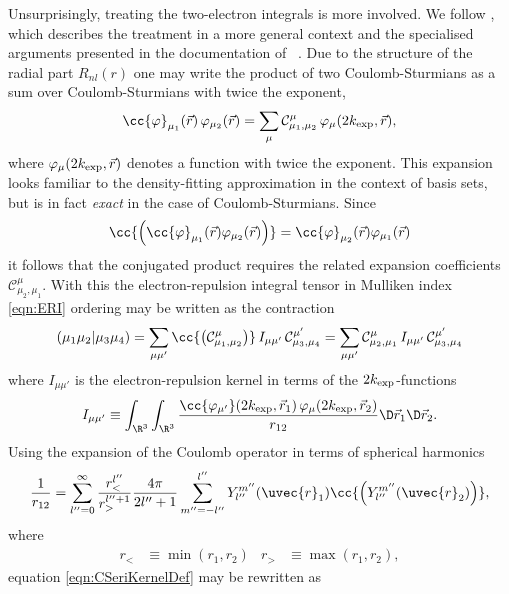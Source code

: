Unsurprisingly, treating the two-electron integrals is more involved.
We follow \cite{Avery2015},
which describes the treatment in a more general context
and the specialised arguments presented in the documentation of
\sturmint~\cite{sturmintWeb}.
Due to the structure of the radial part $R_{nl}(r)$
one may write the product of two Coulomb-Sturmians as a
sum over Coulomb-Sturmians with twice the exponent, \ie
\newcommand{\csC}{\mathcal{C}}
\begin{equation}
	\cc{\varphi}_{\mu_1}(\vec{r}) \, \varphi_{\mu_2}(\vec{r})
	= \sum_{\mu} \csC^\mu_{\mu_1,\mu_2} \, \varphi_{\mu}(2\kexp, \vec{r}),
	\label{eqn:CSshellpairExpansion}
\end{equation}
where $\varphi_{\mu}(2k_\text{exp}, \vec{r})$ denotes a \CS function
with twice the exponent.
This expansion looks familiar to the density-fitting approximation
in the context of \cGTO basis sets,
but is in fact \emph{exact} in the case of Coulomb-Sturmians.
Since
\[ \cc{\left( \cc{\varphi}_{\mu_1}(\vec{r}) \varphi_{\mu_2}(\vec{r}) \right)} =
\cc{\varphi}_{\mu_2}(\vec{r}) \varphi_{\mu_1}(\vec{r}) \]
it follows that the conjugated product requires the related
expansion coefficients $\csC^\mu_{\mu_2,\mu_1}$.
With this the electron-repulsion integral tensor in Mulliken index \eqref{eqn:ERI}
ordering may be written as the contraction
\begin{equation}
	\eriMu{\mu_1\mu_2}{\mu_3\mu_4}
		= \sum_{\mu\mu'} \cc{\left(\csC^\mu_{\mu_1,\mu_2}\right)} \,
		I_{\mu\mu'} \, \csC^{\mu'}_{\mu_3,\mu_4}
		= \sum_{\mu\mu'} \csC^\mu_{\mu_2,\mu_1} \,
		I_{\mu\mu'} \, \csC^{\mu'}_{\mu_3,\mu_4}
	\label{eqn:CSeriContraction}
\end{equation}
where $I_{\mu\mu'}$ is the electron-repulsion kernel in terms of the $2k_\text{exp}$-functions
\begin{equation}
	I_{\mu\mu'} \equiv
	\int_{\R^3} \int_{\R^3}
	\frac{
	\cc{\varphi_{\mu'}}(2\kexp,\vec{r}_1) \,
	\varphi_{\mu}(2\kexp,\vec{r}_2)
	}{r_{12}}
	\D\vec{r}_1 \D\vec{r}_2.
	\label{eqn:CSeriKernelDef}
\end{equation}
Using the expansion of the Coulomb operator
in terms of spherical harmonics~\cite{Avery2018}
\[ \frac{1}{r_{12}} = \sum_{l''=0}^\infty
	\frac{r^{l''}_<}{r_>^{l'' + 1}} \frac{4\pi}{2l'' + 1}
	\sum_{m''=-{l''}}^{l''} Y_{l''}^{m''}(\uvec{r}_1)
	\cc{\left(Y_{l''}^{m''}(\uvec{r}_2)\right)},
\]
where
\begin{align*}
	r_< &\equiv \min(r_1, r_2) & r_> &\equiv \max(r_1, r_2),
\end{align*}
equation \eqref{eqn:CSeriKernelDef} may be rewritten as
